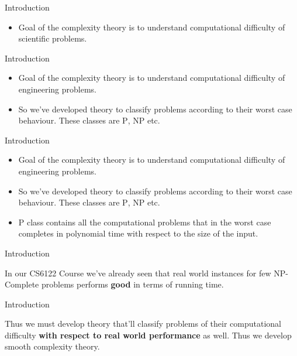 \begin{frame}{Introduction}
    \begin{itemize}
        \item Goal of the complexity theory is to understand computational difficulty of scientific problems.
    \end{itemize}
\end{frame}

\begin{frame}{Introduction}
    \begin{itemize}
        \item Goal of the complexity theory is to understand computational difficulty of engineering problems.
        \item So we've developed theory to classify problems according to their worst case behaviour. These classes are \textsc{P}, \textsc{NP} etc.
    \end{itemize}
\end{frame}

\begin{frame}{Introduction}
    \begin{itemize}
        \item Goal of the complexity theory is to understand computational difficulty of engineering problems.
        \item So we've developed theory to classify problems according to their worst case behaviour. These classes are \textsc{P}, \textsc{NP} etc.
        \item \textsc{P} class contains all the computational problems that in the worst case completes in polynomial time with respect to the size of the input.
    \end{itemize}
\end{frame}

\begin{frame}{Introduction}
    \begin{center}
        In our \textsc{CS6122} Course we've already seen that real world instances for few NP-Complete problems performs \textbf{good} in terms of running time.
    \end{center}
\end{frame}

\begin{frame}{Introduction}
    \begin{center}
        Thus we must develop theory that'll classify problems of their computational difficulty \textbf{with respect to real world performance} as well. Thus we develop smooth complexity theory.
    \end{center}
\end{frame}


